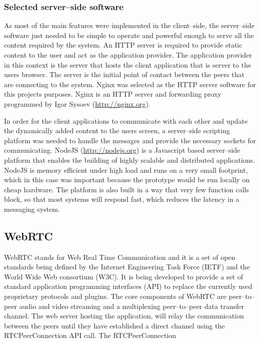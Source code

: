 \documentclass[english,12pt,a4paper,dvips]{article}
\begin{document}
\subsubsection{Selected server--side software}

As most of the main features were implemented in the client--side, the server--side software just needed to be simple to operate and powerful enough to serve all the content required by the system. An HTTP server is required to provide static content to the user and act as the application provider. The application provider in this context is the server that hosts the client application that is server to the users browser. The server is the initial point of contact between the peers that are connecting to the system. Nginx was selected as the HTTP server software for this projects purposes. Nginx is an HTTP server and forwarding proxy programmed by Igor Sysoev (\url{http://nginx.org}).

In order for the client applications to communicate with each other and update the dynamically added content to the users screen, a server--side scripting platform was needed to handle the messages and provide the necessary sockets for communicating. NodeJS (\url{http://nodejs.org}) is a Javascript based server--side platform that enables the building of highly scalable and distributed applications. NodeJS is memory efficient under high load and runs on a very small footprint, which in this case was important because the prototype would be run locally on cheap hardware. The platform is also built in a way that very few function calls block, so that most systems will respond fast, which reduces the latency in a messaging system.



\subsection{WebRTC}

WebRTC stands for Web Real Time Communication and it is a set of open standards being defined by the Internet Engineering Task Force (IETF) and the World Wide Web consortium (W3C). It is being developed to provide a set of standard application programming interfaces (API) to replace the currently used proprietary protocols and plugins. The core components of WebRTC are peer--to--peer audio and video streaming and a multiplexing peer--to--peer data transfer channel. The web server hosting the application, will relay the communication between the peers until they have established a direct channel using the RTCPeerConnection API call. The RTCPeerConnection \cite{Jennings}
\end{document}
